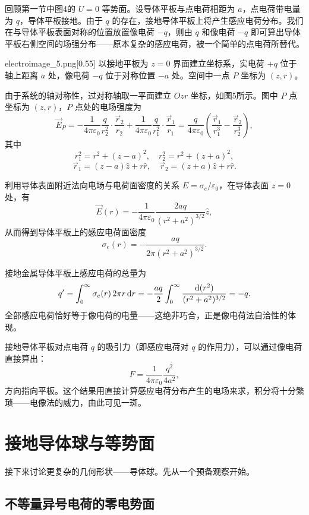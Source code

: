 回顾第一节中图4的 $U=0$ 等势面。设导体平板与点电荷相距为 $a$，点电荷带电量为 $q$，导体平板接地。由于 $q$ 的存在，接地导体平板上将产生感应电荷分布。我们在与导体平板表面对称的位置放置像电荷 $-q$，则由 $q$ 和像电荷 $-q$ 即可算出导体平板右侧空间的场强分布——原本复杂的感应电荷，被一个简单的点电荷所替代。

\begin{singlefigure}[接地导体平板前的点电荷]{electroimage_5.png}[0.55]
    以接地平板为 $z=0$ 界面建立坐标系，实电荷 $+q$ 位于轴上距离 $a$ 处，像电荷 $-q$ 位于对称位置 $-a$ 处。空间中一点 $P$ 坐标为 $(z,r)$。
\end{singlefigure}

由于系统的轴对称性，过对称轴取一平面建立 $Ozr$ 坐标，如图5所示。图中 $P$ 点坐标为 $(z, r)$，$P$ 点处的电场强度为
\[
    \vec{E}_P = -\frac{1}{4\pi\varepsilon_0} \frac{q}{r_2^2} \cdot \frac{\vec{r}_2}{r_2} + \frac{1}{4\pi\varepsilon_0} \frac{q}{r_1^2} \cdot \frac{\vec{r}_1}{r_1} = \frac{q}{4\pi\varepsilon_0} \left( \frac{\vec{r}_1}{r_1^3} - \frac{\vec{r}_2}{r_2^3} \right),
\]
其中
\[
    r_1^2 = r^2 + (z-a)^2, \quad r_2^2 = r^2 + (z+a)^2,
\]
\[
    \vec{r}_1 = (z-a)\hat{z} + r\hat{r}, \quad \vec{r}_2 = (z+a)\hat{z} + r\hat{r}.
\]

利用导体表面附近法向电场与电荷面密度的关系 $E = \sigma_e/\varepsilon_0$，在导体表面 $z=0$ 处，有
\[
    \vec{E}(r) = -\frac{1}{4\pi\varepsilon_0} \frac{2aq}{(r^2 + a^2)^{3/2}} \hat{z},
\]
从而得到导体平板上的感应电荷面密度
\[
    \sigma_e(r) = -\frac{aq}{2\pi (r^2 + a^2)^{3/2}}.
\]

接地金属导体平板上感应电荷的总量为
\[
    q' = \int_0^{\infty} \sigma_e(r) \, 2\pi r \dif r = -\frac{aq}{2} \int_0^{\infty} \frac{\dif(r^2)}{(r^2 + a^2)^{3/2}} = -q.
\]
全部感应电荷恰好等于像电荷的电量——这绝非巧合，正是像电荷法自洽性的体现。

接地导体平板对点电荷 $q$ 的吸引力（即感应电荷对 $q$ 的作用力），可以通过像电荷直接算出：
\[
    F = \frac{1}{4\pi\varepsilon_0} \frac{q^2}{4a^2},
\]
方向指向平板。这个结果用直接计算感应电荷分布产生的电场来求，积分将十分繁琐——电像法的威力，由此可见一斑。


\section{接地导体球与等势面}

接下来讨论更复杂的几何形状——导体球。先从一个预备观察开始。

\subsection{不等量异号电荷的零电势面}

